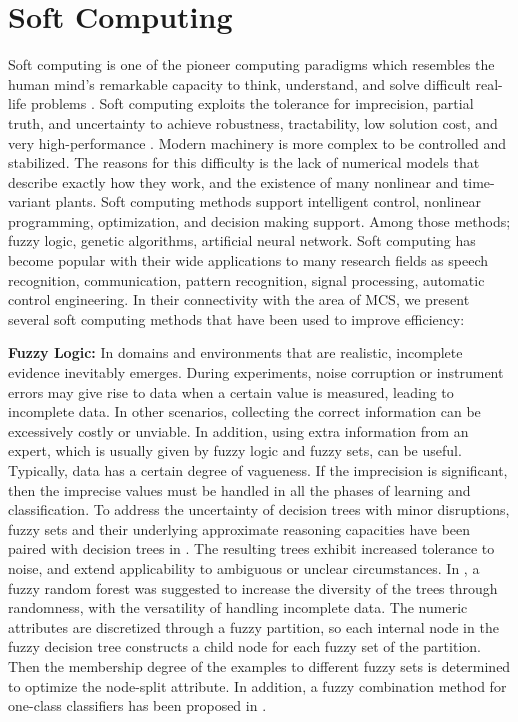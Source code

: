 %
%
\section{Soft Computing}
\label{sec:2_4_soft-computing}
Soft computing is one of the pioneer computing paradigms which resembles the human mind's remarkable capacity to think, understand, and solve difficult real-life problems \cite{das2013,konar2018}. Soft computing exploits the tolerance for imprecision, partial truth, and uncertainty to achieve robustness, tractability, low solution cost, and very high-performance \cite{zhu2015}. Modern machinery is more complex to be controlled and stabilized. The reasons for this difficulty is the lack of numerical models that describe exactly how they work, and the existence of many nonlinear and time-variant plants. Soft computing methods support intelligent control, nonlinear programming, optimization, and decision making support. Among those methods; fuzzy logic, genetic algorithms, artificial neural network. Soft computing has become popular with their wide applications to many research fields as speech recognition, communication, pattern recognition, signal processing, automatic control engineering. In their connectivity with the area of MCS, we present several soft computing methods that have been used to improve efficiency:


 \textbf{Fuzzy Logic:}
In domains and environments that are realistic, incomplete evidence inevitably emerges. During experiments, noise corruption or instrument errors may give rise to data when a certain value is measured, leading to incomplete data. In other scenarios, collecting the correct information can be excessively costly or unviable. In addition, using extra information from an expert, which is usually given by fuzzy logic and fuzzy sets, can be useful. Typically, data has a certain degree of vagueness. If the imprecision is significant, then the imprecise values must be handled in all the phases of learning and classification. To address the uncertainty of decision trees with minor disruptions, fuzzy sets and their underlying approximate reasoning capacities have been paired with decision trees in \cite{yuan1995,olaru2003}. The resulting trees exhibit increased tolerance to noise, and extend applicability to ambiguous or unclear circumstances. In \cite{bonissone2010}, a fuzzy random forest was suggested to increase the diversity of the trees through randomness, with the versatility of handling incomplete data. The numeric attributes are discretized through a fuzzy partition, so each internal node in the fuzzy decision tree constructs a child node for each fuzzy set of the partition. Then the membership degree of the examples to different fuzzy sets is determined to optimize the node-split attribute. In addition, a fuzzy combination method for one-class classifiers has been proposed in \cite{wilk2012}.             

